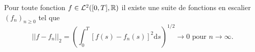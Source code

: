 Pour toute fonction $f\in\mathcal{L}^2([0,T],\mathbb{R})$ il existe une suite de fonctions en escalier $(f_n)_{n\geq 0}$ tel que 
$$
||f-f_n||_2 = \left(\int_0^T\left[f(s)-f_n(s)\right]^2\text{d}s\right)^{1/2}\rightarrow 0\text{ pour }n\rightarrow \infty.
$$
